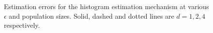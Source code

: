 \documentclass[12pt]{article}
\begin{document}
\begin{description}
\begin{figure}
{        }
        \caption{Estimation errors for the histogram estimation mechanism at various $\epsilon$ and population sizes. Solid, dashed and dotted lines are $d=1,2,4$ respectively.}
        \label{fig:histogram_errors}
    \end{figure}
    
    
    

\end{description}
\end{document}
